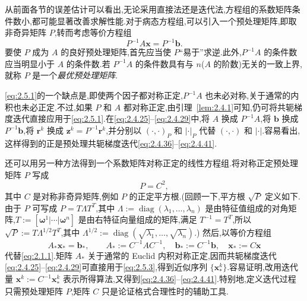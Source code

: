 从前面各节的误差估计可以看出,无论采用直接法还是迭代法,方程组的系数矩阵条件数小,都可能显著改善求解性能.对于病态方程组,可以引入一个预处理矩阵,即取非奇异矩阵 \(P\),转而考虑等价方程组
\begin{equation}\label{eq:2.5.1}
  P^{-1}A\boldsymbol{x}=P^{-1}\boldsymbol{b}.
\end{equation}
要使 \(P\) 成为 \(A\) 的良好预处理矩阵,首先应当使 \(P\)“易于”求逆.此外,\(P^{-1}A\) 的条件数应当明显小于 \(A\) 的条件数.若 \(P^{-1}A\) 的条件数具有与 \(n\)(\(A\) 的阶数)无关的一致上界,就称 \(P\) 是一个\emph{最优预处理矩阵}.

\eqref{eq:2.5.1}的一个缺点是,即使两个因子都对称正定,\(P^{-1}A\) 也未必对称,关于通常的内积也未必正定.不过,如果 \(P\) 和 \(A\) 都对称正定,由引理~\ref{lem:2.4.1}可知,仍可将共轭梯度迭代直接应用于\eqref{eq:2.5.1}.在\eqref{eq:2.4.25}–\eqref{eq:2.4.29}中,将 \(A\) 换成 \(P^{-1}A\),将 \(\boldsymbol{b}\) 换成 \(P^{-1}\boldsymbol{b}\),将 \(\boldsymbol{r}^k\) 换成 \(\boldsymbol{z}^k=P^{-1}\boldsymbol{r}^k\),并分别以 \((\cdot,\cdot)_P\) 和 \(|\cdot|_P\) 代替 \((\cdot,\cdot)\) 和 \(|\cdot|\).容易看出,这样得到的正是预处理共轭梯度迭代\eqref{eq:2.4.36}–\eqref{eq:2.4.41}.

还可以用另一种方法得到一个系数矩阵对称正定的线性方程组.将对称正定预处理矩阵 \(P\) 写成
\begin{equation}\label{eq:2.5.2}
  P=C^2,
\end{equation}
其中 \(C\) 是对称非奇异矩阵,例如 \(P\) 的正定平方根.(回顾一下,平方根 \(\sqrt P\) 定义如下.由于 \(P\) 可写成 \(P=T\Lambda T^T\),其中 \(\Lambda:=\operatorname{diag}(\lambda_1,\ldots,\lambda_n)\) 是由特征值组成的对角矩阵,\(T:=[\boldsymbol{\omega}^1|\cdots|\boldsymbol{\omega}^n]\) 是由右特征向量组成的矩阵,满足 \(T^{-1}=T^T\),所以
\(\sqrt P:=T\Lambda^{1/2}T^T\),其中
\(\Lambda^{1/2}:=\operatorname{diag}(\sqrt{\lambda_1},\ldots,\sqrt{\lambda_n})\).)
然后,以等价方程组
\begin{equation}\label{eq:2.5.3}
  A_*\boldsymbol{x}_*=\boldsymbol{b}_*,\qquad
  A_*:=C^{-1}AC^{-1},\quad \boldsymbol{b}_*:=C^{-1}\boldsymbol{b},\quad
  \boldsymbol{x}_*:=C\boldsymbol{x}
\end{equation}
代替\eqref{eq:2.1.1}.矩阵 \(A_*\) 关于通常的 Euclid 内积对称正定,因而共轭梯度迭代\eqref{eq:2.4.25}–\eqref{eq:2.4.29}可直接用于\eqref{eq:2.5.3},得到近似序列 \(\{\boldsymbol{x}_*^k\}\).容易证明,改用迭代量 \(\boldsymbol{x}^k:=C^{-1}\boldsymbol{x}_*^k\) 表示所得算法,又得到\eqref{eq:2.4.36}–\eqref{eq:2.4.41}.特别地,定义迭代过程只需预处理矩阵 \(P\),矩阵 \(C\) 只是论证格式合理性时的辅助工具.


